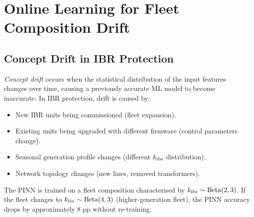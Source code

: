
\section{Online Learning for Fleet Composition Drift}
\label{sec:ch8_online}

\subsection{Concept Drift in IBR Protection}

\emph{Concept drift} occurs when the statistical distribution of the
input features changes over time, causing a previously accurate ML model
to become inaccurate. In IBR protection, drift is caused by:
\begin{itemize}
\item New IBR units being commissioned (fleet expansion).
\item Existing units being upgraded with different firmware (control parameters change).
\item Seasonal generation profile changes (different $k_\mathrm{ibr}$ distribution).
\item Network topology changes (new lines, removed transformers).
\end{itemize}
The PINN is trained on a fleet composition characterised by
$k_\mathrm{ibr} \sim \mathrm{Beta}(2, 3)$. If the fleet changes to
$k_\mathrm{ibr} \sim \mathrm{Beta}(4, 3)$ (higher-generation fleet), the PINN
accuracy drops by approximately 8 pp without re-training.

